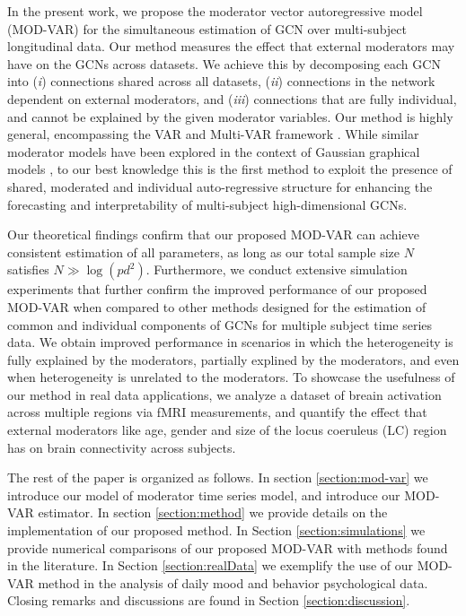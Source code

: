 In the present work, we propose the moderator vector autoregressive model (MOD-VAR) for the simultaneous estimation of GCN over multi-subject longitudinal data. Our method measures the effect that external moderators may have on the GCNs across datasets. We achieve this by decomposing each GCN into (\textit{i}) connections shared across all datasets, (\textit{ii}) connections in the network dependent on external moderators, and (\textit{iii}) connections that are fully individual, and cannot be explained by the given moderator variables. Our method is highly general, encompassing the VAR and Multi-VAR framework \citep{fisher2022penalized,fisher2024structured}. While similar moderator models have been explored in the context of Gaussian graphical models \citep{ni2022bayesian,zhang2023high,liu2024convex}, to our best knowledge this is the first method to exploit the presence of shared, moderated and individual auto-regressive structure for enhancing the forecasting and interpretability of multi-subject high-dimensional GCNs.

Our theoretical findings confirm that our proposed MOD-VAR can achieve consistent estimation of all parameters, as long as  our total sample size $N$ satisfies $N \gg \log(pd^2)$. Furthermore, we conduct extensive simulation experiments that further confirm the improved performance of our proposed MOD-VAR when compared to other methods designed for the estimation of common and individual components of GCNs for multiple subject time series data. We obtain improved performance in scenarios in which the heterogeneity is fully explained by the moderators, partially explined by the moderators, and even when heterogeneity is unrelated to the moderators. To showcase the usefulness of our method in real data applications, we analyze a dataset of breain activation across multiple regions via fMRI measurements, and quantify the effect that external moderators like age, gender and size of the locus coeruleus (LC) region has on brain connectivity across subjects.


The rest of the paper is organized as follows. In section \ref{section:mod-var} we introduce our model of moderator time series model, and introduce our MOD-VAR estimator. In section \ref{section:method} we provide details on the implementation of our proposed method. In Section \ref{section:simulations} we provide numerical comparisons of our proposed MOD-VAR with methods found in the literature. In Section \ref{section:realData} we exemplify the use of our MOD-VAR method in the analysis of daily mood and behavior psychological data. Closing remarks and discussions are found in Section \ref{section:discussion}.


